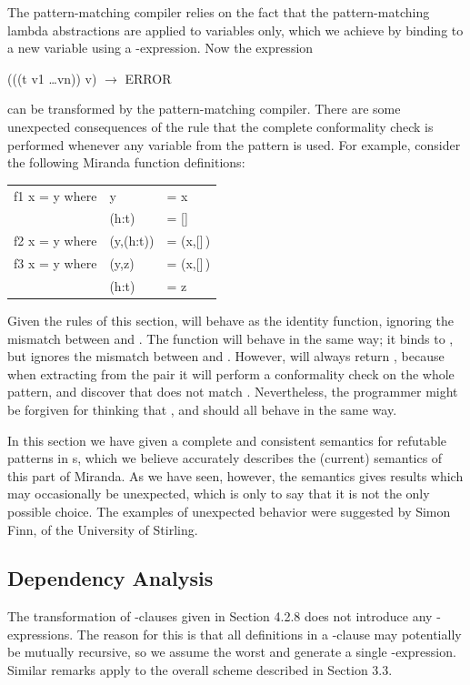 {The pattern-matching compiler relies on the fact that the pattern-matching
lambda abstractions are applied to variables only, which we achieve by
binding  to a new variable  using a -expression. Now the expression
\begin{mlcoded}
	(((t v1 \ldots vn)) v) $\rightarrow{}$ \fatbar{} ERROR
\end{mlcoded}
can be transformed by the pattern-matching compiler.
There are some unexpected consequences of the rule that the complete
conformality check is performed whenever any variable from the pattern is
used. For example, consider the following Miranda function definitions:
\begin{mlcoded}
	\begin{tabular}{lll}
	f1 x = y where\; &y &= x\\
	&(h:t) &= [\;] \\
	f2 x = y where\; &(y,(h:t)) &= (x,[\;]\,) \\
	f3 x = y where\; &(y,z) &= (x,[\;]\,) \\
	&(h:t) &= z
	\end{tabular}
\end{mlcoded}

Given the rules of this section,  will behave as the identity function,
ignoring the mismatch between  and \ml{[\;]}. The function  will behave in the
same way; it binds  to \ml{[\;]}, but ignores the mismatch between  and .
However,  will always return , because when extracting  from the
pair it will perform a conformality check on the whole pattern, and discover
that  does not match \ml{[\;]}. Nevertheless, the programmer might be forgiven
for thinking that ,  and  should all behave in the same way.

In this section we have given a complete and consistent semantics for
refutable patterns in s, which we believe accurately describes the
(current) semantics of this part of Miranda. As we have seen, however, the
semantics gives results which may occasionally be unexpected, which is only
to say that it is not the only possible choice. The examples of unexpected
behavior were suggested by Simon Finn, of the University of Stirling.

\subsection{Dependency Analysis}
The transformation of -clauses given in Section 4.2.8 does not introduce
any -expressions. The reason for this is that all definitions in a -clause
may potentially be mutually recursive, so we assume the worst and generate a
single -expression. Similar remarks apply to the overall scheme
described in Section 3.3.

}
